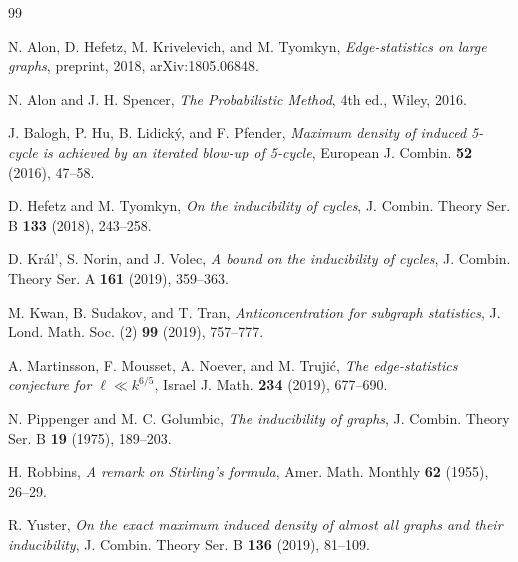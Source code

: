\documentclass[11pt]{article}
\theoremstyle{definition}
\numberwithin{equation}{section}
\begin{document}
\begin{thebibliography}{99}

 N. Alon, D. Hefetz, M. Krivelevich, and M. Tyomkyn, \textit{Edge-statistics on large graphs}, preprint, 2018, arXiv:1805.06848.

 N. Alon and J. H. Spencer, \textit{The Probabilistic Method}, 4th ed., Wiley, 2016.

  J. Balogh, P. Hu, B. Lidick\'{y}, and F. Pfender, \textit{Maximum density of induced 5-cycle is achieved by an iterated blow-up of 5-cycle}, European J. Combin. \textbf{52} (2016), 47--58.

 D. Hefetz and M. Tyomkyn, \textit{
On the inducibility of cycles}, J. Combin. Theory Ser. B \textbf{133} (2018), 243--258.

 D. Kr\'{a}l', S. Norin, and J. Volec, \textit{A bound on the inducibility of cycles}, J. Combin. Theory Ser. A \textbf{161} (2019), 359--363.

 M. Kwan, B. Sudakov, and T. Tran, \textit{ Anticoncentration for subgraph statistics}, J. Lond. Math. Soc. (2) \textbf{99} (2019), 757--777.

 A. Martinsson, F. Mousset, A. Noever, and M. Truji\'c, \textit{The edge-statistics conjecture for $\ell\ll k^{6/5}$}, Israel J. Math. \textbf{234} (2019), 677--690.

 N. Pippenger and M. C. Golumbic, \textit{The inducibility of graphs},  J. Combin. Theory Ser. B \textbf{19} (1975), 189--203.

 H. Robbins, \textit{A remark on Stirling's formula}, Amer. Math. Monthly \textbf{62} (1955), 26--29. 

 R. Yuster, \textit{On the exact maximum induced density of almost all graphs and their inducibility}, J. Combin. Theory Ser. B \textbf{ 136} (2019), 81--109.

\end{thebibliography}
\end{document}
